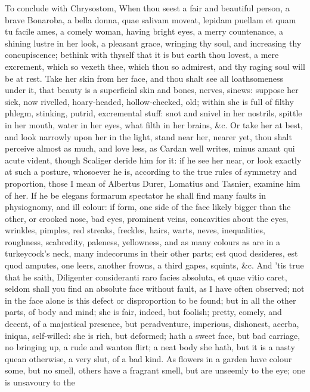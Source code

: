 {To conclude with Chrysostom, When thou seest a fair and beautiful
person, a brave Bonaroba, a bella donna, quae salivam moveat, lepidam
puellam et quam tu facile ames, a comely woman, having bright eyes, a
merry countenance, a shining lustre in her look, a pleasant grace,
wringing thy soul, and increasing thy concupiscence; bethink with
thyself that it is but earth thou lovest, a mere excrement, which so
vexeth thee, which thou so admirest, and thy raging soul will be at
rest. Take her skin from her face, and thou shalt see all loathsomeness
under it, that beauty is a superficial skin and bones, nerves, sinews:
suppose her sick, now rivelled, hoary-headed, hollow-cheeked, old;
within she is full of filthy phlegm, stinking, putrid, excremental
stuff: snot and snivel in her nostrils, spittle in her mouth, water in
her eyes, what filth in her brains, \&c. Or take her at best, and look
narrowly upon her in the light, stand near her, nearer yet, thou shalt
perceive almost as much, and love less, as  Cardan well writes,
minus amant qui acute vident, though Scaliger deride him for it: if he
see her near, or look exactly at such a posture, whosoever he is,
according to the true rules of symmetry and proportion, those I mean of
Albertus Durer, Lomatius and Tasnier, examine him of her. If he be
elegans formarum spectator he shall find many faults in physiognomy,
and ill colour: if form, one side of the face likely bigger than the
other, or crooked nose, bad eyes, prominent veins, concavities about
the eyes, wrinkles, pimples, red streaks, freckles, hairs, warts,
neves, inequalities, roughness, scabredity, paleness, yellowness, and
as many colours as are in a turkeycock's neck, many indecorums in their
other parts; est quod desideres, est quod amputes, one leers, another
frowns, a third gapes, squints, \&c. And 'tis true that he saith,
Diligenter consideranti raro facies absoluta, et quae vitio
caret, seldom shall you find an absolute face without fault, as I have
often observed; not in the face alone is this defect or disproportion
to be found; but in all the other parts, of body and mind; she is fair,
indeed, but foolish; pretty, comely, and decent, of a majestical
presence, but peradventure, imperious, dishonest, acerba, iniqua,
self-willed: she is rich, but deformed; hath a sweet face, but bad
carriage, no bringing up, a rude and wanton flirt; a neat body she
hath, but it is a nasty quean otherwise, a very slut, of a bad kind. As
flowers in a garden have colour some, but no smell, others have a
fragrant smell, but are unseemly to the eye; one is unsavoury to the
}
